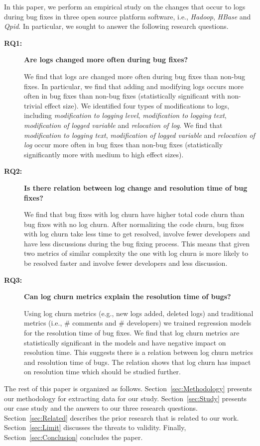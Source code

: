 In this paper, we perform an empirical study on the changes that occur to logs during bug fixes in three open source platform software, i.e., \emph{Hadoop}, \emph{HBase} and \emph{Qpid}. In particular, we sought to answer the following research questions. 

\begin{description}
\item[\textbf{RQ1:}]\textbf{Are logs changed more often during bug fixes?} 

We find that logs are changed more often during bug fixes than non-bug fixes. In particular, we find that adding and modifying logs occurs more often in bug fixes than non-bug fixes (statistically significant with non-trivial effect size). We identified four types of modifications to logs, including \emph{modification to logging level}, \emph{modification to logging text}, \emph{modification of logged variable} and \emph{relocation of log}. We find that \emph{modification to logging text}, \emph{modification of logged variable} and \emph{relocation of log} occur more often in bug fixes than non-bug fixes (statistically significantly more with medium to high effect sizes). 



\item[\textbf{RQ2:}]\textbf{Is there relation between log change and resolution time of bug fixes?}

We find that bug fixes with log churn have higher total code churn than bug fixes with no log churn. After normalizing the code churn, bug fixes with log churn take less time to get resolved, involve fewer developers and have less discussions during the bug fixing process. This means that given two metrics of similar complexity the one with log churn is more likely to be resolved faster and involve fewer developers and less discussion. 



\item[\textbf{RQ3:}]\textbf{Can log churn metrics explain the resolution time of bugs?}

Using log churn metrics (e.g., new logs added, deleted logs) and traditional metrics (i.e., \# comments and \# developers) we trained regression models for the resolution time of bug fixes. We find that log churn metrics are statistically significant in the models and have negative impact on resolution time. This suggests there is a relation between log churn metrics and resolution time of bugs. The relation shows that log churn has impact on resolution time which should be studied further. 

\end{description}


The rest of this paper is organized as follows. Section~\ref{sec:Methodology} presents our methodology for extracting data for our study. Section~\ref{sec:Study} presents our case study and the answers to our three research questions. Section~\ref{sec:Related} describes the prior research that is related to our work. Section~\ref{sec:Limit}  discusses the threats to validity. Finally, Section~\ref{sec:Conclusion} concludes the paper.


